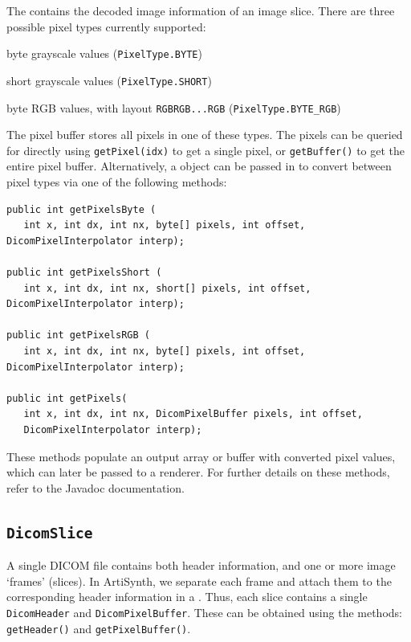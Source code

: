 The  contains the decoded image information of an image slice.
There are three possible pixel types currently supported:
\begin{tightemize}
   \item byte grayscale values (\lstinline{PixelType.BYTE})
   \item short grayscale values (\lstinline{PixelType.SHORT})
   \item byte RGB values, with layout \lstinline{RGBRGB...RGB} (\lstinline{PixelType.BYTE_RGB})
\end{tightemize}
The pixel buffer stores all pixels in one of these types.  The pixels can be queried for directly
using \lstinline{getPixel(idx)} to get a single pixel, or \lstinline{getBuffer()} to get the
entire pixel buffer.  Alternatively, a  object
can be passed in to convert between pixel types via one of the following methods:
\begin{lstlisting}[]
public int getPixelsByte (
   int x, int dx, int nx, byte[] pixels, int offset, DicomPixelInterpolator interp);

public int getPixelsShort (
   int x, int dx, int nx, short[] pixels, int offset, DicomPixelInterpolator interp);

public int getPixelsRGB (
   int x, int dx, int nx, byte[] pixels, int offset, DicomPixelInterpolator interp);

public int getPixels(
   int x, int dx, int nx, DicomPixelBuffer pixels, int offset, 
   DicomPixelInterpolator interp);
\end{lstlisting}
These methods populate an output array or buffer with converted pixel values, which can later
be passed to a renderer.  For further details on these methods, refer to the Javadoc documentation.

\subsection{\texttt{DicomSlice}}

A single DICOM file contains both header information, and one or more image `frames' (slices).  In
ArtiSynth, we separate each frame and attach them to the corresponding header information in
a .  Thus, each slice contains a single \lstinline{DicomHeader} and 
\lstinline{DicomPixelBuffer}.  These can be obtained using the methods: \lstinline{getHeader()} and
\lstinline{getPixelBuffer()}.  

